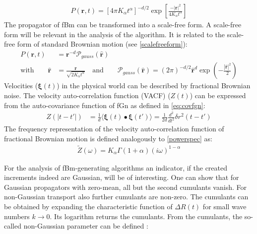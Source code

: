 \documentclass[
  a4paper,BCOR10mm,twoside,
  headsepline,footsepline,%
  fleqn,openbib
]{scrbook}
\begin{document}
\begin{align}
 P(\bm{r},t)=[4 \pi K_{\alpha} t^{\alpha}]^{-d/2} \exp \left[ \frac{-|\bm{r}|^2}{ 4 K_{\alpha} t^{\alpha} }\right]
\end{align}
The propagator of fBm can be transformed into a scale-free form. A scale-free form will be relevant in the analysis of the algorithm. It is related to the scale-free form of standard Brownian motion (see \cref{scalefreeform}):
\begin{align}
P(\bm{r},t)&= \bm{r}^{-d} \mathcal{P}_{gauss}(\hat{\bm{r}}) \\ \text{with} \qquad \hat{\bm{r}} &= \frac{\bm{r}}{\sqrt{2 K_{\alpha} t^{\alpha}}}  \quad \text{and} \qquad \mathcal{P}_{gauss}(\bm{\hat{r}})= (2 \pi)^{-d/2}  \bm{\hat{r}}^d \exp \left(- \frac{|\bm{\hat{r}}|^2}{2} \right)\label{scalefreeformfrac}
\end{align}
Velocities ($\bm{\xi}(t)$) in the physical world can be described by fractional Brownian noise. The velocity auto-correlation function (VACF) ($Z(t)$) can be expressed from the auto-covariance function of fGn as defined in \cref{eq:covfgn}:
\begin{align}
Z(|t-t'|)&= \frac{1}{d}\langle \bm{\xi}(t) \bullet \bm{\xi}(t') \rangle = \frac{1}{2d} \frac{d^2}{dt^2} \delta r^2 (t-t')  
\end{align}
The frequency representation of the velocity auto-correlation function of fractional Brownian motion is defined analogously to \cref{powerspec} as:
\begin{align}
  \tilde{Z}(\omega) =  K_{\alpha} \Gamma(1+\alpha)(i \omega)^{1-\alpha}
\end{align}

For the analysis of fBm-generating algorithms an indicator, if the created increments indeed are Gaussian, will be of interesting. One can show that for Gaussian propagators with zero-mean, all but the second cumulants vanish. For non-Gaussian transport also further cumulants are non-zero. The cumulants can be obtained by expanding the characteristic function of $\Delta R(t)$ for small wave numbers $k \rightarrow 0$. Its logarithm returns the cumulants. From the cumulants, the so-called non-Gaussian parameter can be defined \cite{Hofling2013}:
\end{document}
